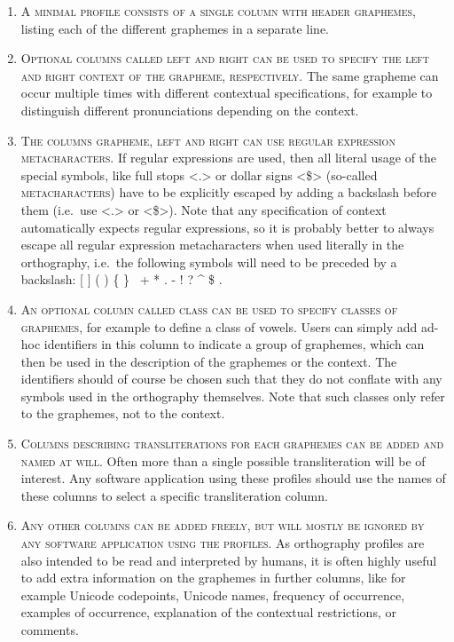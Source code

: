 \begin{enumerate}
	\def\labelenumi{\arabic{enumi}.} 
	\item \textsc{A minimal profile consists of a single column with header \textsc{graphemes}}, listing each of the different graphemes in a separate line. 
	\item \textsc{Optional columns called \textsc{left} and \textsc{right} can be used to specify the left and right context of the grapheme, respectively.} The same grapheme can occur multiple times with different contextual specifications, for example to distinguish different pronunciations depending on the context. 
	\item \textsc{The columns \textsc{grapheme}, \textsc{left} and \textsc{right} can use regular expression metacharacters.} If regular expressions are used, then all literal usage of the special symbols, like full stops <.> or dollar signs <\$> (so-called \textsc{metacharacters}) have to be explicitly escaped by adding a backslash before them (i.e.~use <.> or <\$>). Note that any specification of context automatically expects regular expressions, so it is probably better to always escape all regular expression metacharacters when used literally in the orthography, i.e.~the following symbols will need to be preceded by a backslash: {[} {]} ( ) \{ \} ~+ * . - ! ? \^{} \$ . 
	\item \textsc{An optional column called \textsc{class} can be used to specify classes of graphemes}, for example to define a class of vowels. Users can simply add ad-hoc identifiers in this column to indicate a group of graphemes, which can then be used in the description of the graphemes or the context. The identifiers should of course be chosen such that they do not conflate with any symbols used in the orthography themselves. Note that such classes only refer to the graphemes, not to the context. 
	\item \textsc{Columns describing transliterations for each graphemes can be added and named at will}. Often more than a single possible transliteration will be of interest. Any software application using these profiles should use the names of these columns to select a specific transliteration column. 
	\item \textsc{Any other columns can be added freely, but will mostly be ignored by any software application using the profiles}. As orthography profiles are also intended to be read and interpreted by humans, it is often highly useful to add extra information on the graphemes in further columns, like for example Unicode codepoints, Unicode names, frequency of occurrence, examples of occurrence, explanation of the contextual restrictions, or comments. 
\end{enumerate}


